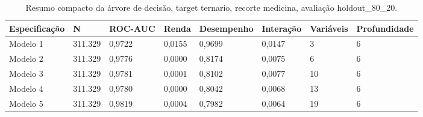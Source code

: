 \begin{table}
\caption{Resumo compacto da árvore de decisão, target ternario, recorte medicina, avaliação holdout_80_20.}
\label{tab:tabela_compacta_treeClassification_ternario_recorte_medicina_holdout_80_20}
\begin{tabular}{llllllll}
\toprule
Especificação & N & ROC-AUC & Renda & Desempenho & Interação & Variáveis & Profundidade \\
\midrule
Modelo 1 & 311.329 & 0,9722 & 0,0155 & 0,9699 & 0,0147 & 3 & 6 \\
Modelo 2 & 311.329 & 0,9776 & 0,0000 & 0,8174 & 0,0075 & 6 & 6 \\
Modelo 3 & 311.329 & 0,9781 & 0,0001 & 0,8102 & 0,0077 & 10 & 6 \\
Modelo 4 & 311.329 & 0,9780 & 0,0000 & 0,8042 & 0,0068 & 13 & 6 \\
Modelo 5 & 311.329 & 0,9819 & 0,0004 & 0,7982 & 0,0064 & 19 & 6 \\
\bottomrule
\end{tabular}
\end{table}
